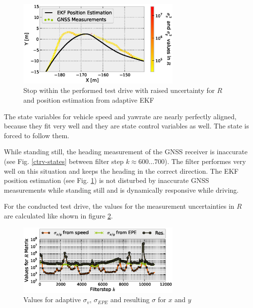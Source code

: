 \documentclass[conference]{IEEEtran}
\begin{document}
\begin{figure}[ht]
\centering
\includegraphics[width=3.2in]{images/Extended-Kalman-Filter-CTRV-Position-Detail}
\caption{Stop within the performed test drive with raised uncertainty for $R$ and position estimation from adaptive EKF}
\label{ctrv-position-detail}
\end{figure}


The state variables for vehicle speed and yawrate are nearly perfectly aligned, because they fit very well and they are state control variables as well. The state is forced to follow them.

While standing still, the heading measurement of the GNSS receiver is inaccurate (see Fig. \ref{ctrv-states} between filter step $k\approx600\dotsc700$). The filter performes very well on this situation and keeps the heading in the correct direction. The EKF position estimation (see Fig. \ref{ctrv-position-detail}) is not disturbed by inaccurate GNSS measurements while standing still and is dynamically responsive while driving. 

For the conducted test drive, the values for the measurement uncertainties in $R$ are calculated like shown in figure \ref{adaptive-R}.

\begin{figure}[ht]
\centering
\includegraphics[width=3.2in]{images/Extended-Kalman-Filter-CTRV-Adaptive-R}
\caption{Values for adaptive $\sigma_v$, $\sigma_{EPE}$ and resulting $\sigma$ for $x$ and $y$}
\label{adaptive-R}
\end{figure}


\end{document}
